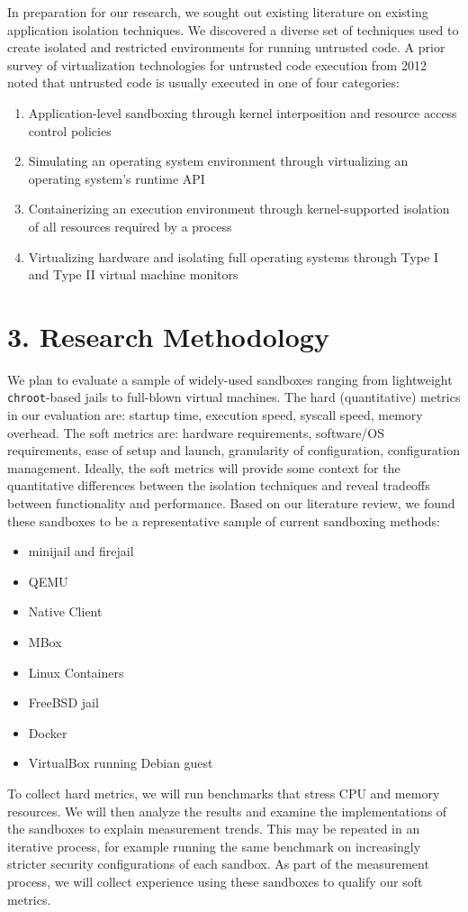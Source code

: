 \documentclass{proc}
\begin{document}
In preparation for our research, we sought out existing literature on existing application isolation techniques. We discovered a diverse set of techniques used to create isolated and restricted environments for running untrusted code.
\newline\newline
A prior survey of virtualization technologies for untrusted code execution from 2012 \cite{wen2012survey} noted that untrusted code is usually executed in one of four categories:
\begin{enumerate}
    \item Application-level sandboxing through kernel interposition and resource access control policies
    \item Simulating an operating system environment through virtualizing an operating system's runtime API
    \item Containerizing an execution environment through kernel-supported isolation of all resources required by a process
    \item Virtualizing hardware and isolating full operating systems through Type I and Type II virtual machine monitors
\end{enumerate}

\section*{3. Research Methodology}
We plan to evaluate a sample of widely-used sandboxes ranging from lightweight \texttt{chroot}-based jails to full-blown virtual machines. The hard (quantitative) metrics in our evaluation are: startup time, execution speed, syscall speed, memory overhead. The soft metrics are: hardware requirements, software/OS requirements, ease of setup and launch, granularity of configuration, configuration management. Ideally, the soft metrics will provide some context for the quantitative differences between the isolation techniques and reveal tradeoffs between functionality and performance. 
Based on our literature review, we found these sandboxes to be a representative sample of current sandboxing methods:\vspace{0.5em}
{\small
\begin{itemize}
\item minijail and firejail
\item QEMU
\item Native Client
\item MBox
\item Linux Containers
\item FreeBSD jail
\item Docker
\item VirtualBox running Debian guest
\end{itemize}
}
To collect hard metrics, we will run benchmarks that stress CPU and memory resources. We will then analyze the results and examine the implementations of the sandboxes to explain measurement trends. This may be repeated in an iterative process, for example running the same benchmark on increasingly stricter security configurations of each sandbox. As part of the measurement process, we will collect experience using these sandboxes to qualify our soft metrics.
\end{document}
